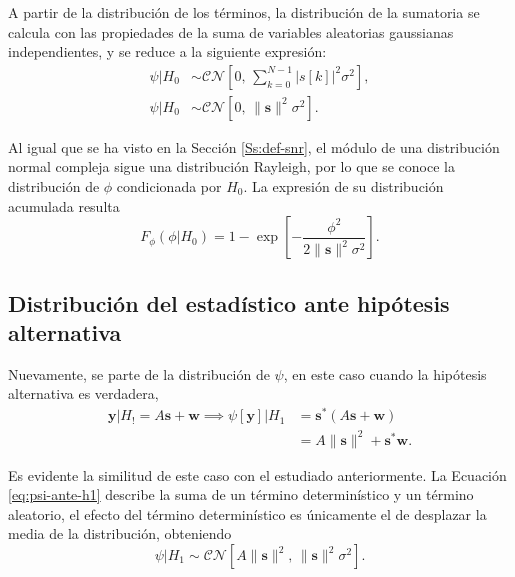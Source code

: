 A partir de la distribución de los términos, la distribución de la sumatoria se calcula con las propiedades de la suma de variables aleatorias gaussianas independientes, y se reduce a la siguiente expresión:
\begin{equation}
    \begin{aligned}
        \psi | H_0 &\sim \mathcal{CN}\left[0,\, \sum_{k=0}^{N-1} \lvert s[k]\rvert^2  \sigma^2 \right],\\[0.5em]
        \psi | H_0 &\sim \mathcal{CN}\left[0,\,\lVert \mathbf{s}\rVert^2  \sigma^2 \right].
    \end{aligned}
\end{equation}

Al igual que se ha visto en la Sección \ref{Ss:def-snr}, el módulo de una distribución normal compleja sigue una distribución Rayleigh, por lo que se conoce la distribución de $\phi$ condicionada por $H_0$. La expresión de su distribución acumulada resulta
\begin{equation}\label{eq:phi-ante-h0}
    F_\phi(\phi|H_0) = 1- \exp\left[-\frac{\phi^2}{2\lVert\mathbf{s}\rVert^2 \sigma^2}\right].
\end{equation}

\subsection{Distribución del estadístico ante hipótesis alternativa}

Nuevamente, se parte de la distribución de $\psi$, en este caso cuando la hipótesis alternativa es verdadera,
\begin{equation}\label{eq:psi-ante-h1}
    \begin{aligned} 
        \mathbf{y} | H_! = A\mathbf{s} + \mathbf{w} \implies \psi[\mathbf{y}] | H_1  
        &= \mathbf{s}^\ast\left(A\mathbf{s}+\mathbf{w}\right)\\ 
        &= A\lVert\mathbf{s}\rVert^2+\mathbf{s}^\ast\mathbf{w}.
    \end{aligned}
\end{equation}

Es evidente la similitud de este caso con el estudiado anteriormente. La Ecuación \ref{eq:psi-ante-h1} describe la suma de un término determinístico y un término aleatorio, el efecto del término determinístico es únicamente el de desplazar la media de la distribución, obteniendo
\begin{equation}
    \psi | H_1 \sim \mathcal{CN}\left[A\lVert\mathbf{s}\rVert^2,\,\lVert \mathbf{s}\rVert^2  \sigma^2 \right].
\end{equation}

